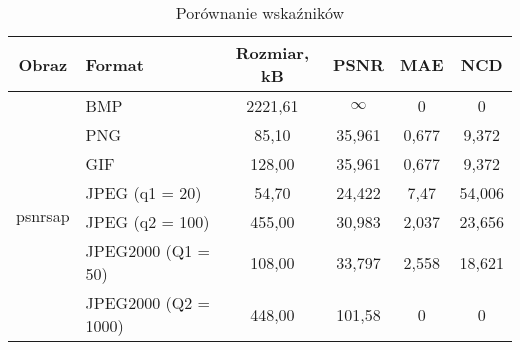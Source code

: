 \begin{table}[h]
    \centering
    \begin{tabular}{|c|l|c|c|c|c|}
        \hline
        Obraz   & Format               & Rozmiar, kB & PSNR     & MAE    & NCD    \\ \hline
        \multirow{7}{*}{\begin{sideways}psnrsap\end{sideways}} 
                & BMP                  & 2221,61     & $\infty$ & 0      & 0      \\ \cline{2-6}
                & PNG                  & 85,10       & 35,961   & 0,677  & 9,372  \\ \cline{2-6}
                & GIF                  & 128,00      & 35,961   & 0,677  & 9,372  \\ \cline{2-6}
                & JPEG (q1 = 20)       & 54,70       & 24,422   & 7,47   & 54,006 \\ \cline{2-6}
                & JPEG (q2 = 100)      & 455,00      & 30,983   & 2,037  & 23,656 \\ \cline{2-6}  
                & JPEG2000 (Q1 = 50)   & 108,00      & 33,797   & 2,558  & 18,621 \\ \cline{2-6}  
                & JPEG2000 (Q2 = 1000) & 448,00      & 101,58   & 0      & 0      \\ \hline
    \end{tabular}
    \caption{Porównanie wskaźników}
    \label{synthetic_colorScreenshot_table}
\end{table}

